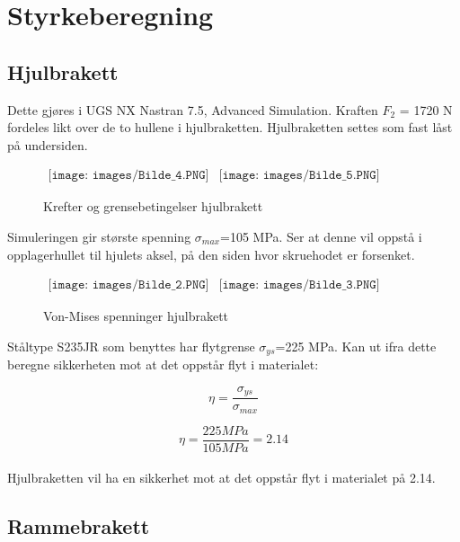 \section{Styrkeberegning}
\subsection{Hjulbrakett}
Dette gjøres i UGS NX Nastran 7.5, Advanced Simulation. Kraften $F_{2}$ = 1720 N fordeles likt over de to hullene i hjulbraketten. Hjulbraketten settes som fast låst på undersiden.

\begin{figure}[H]
\begin{center}$
\begin{array}{ccc}
\texttt{[image: images/Bilde\_4.PNG]} &
\texttt{[image: images/Bilde\_5.PNG]} &  
\end{array}$
\end{center}
\caption{Krefter og grensebetingelser hjulbrakett}
\end{figure}

Simuleringen gir største spenning $\sigma_{max}$=105 MPa. Ser at denne vil oppstå i opplagerhullet til hjulets aksel, på den siden hvor skruehodet er forsenket.

\begin{figure}[H]
\begin{center}$
\begin{array}{ccc}
\texttt{[image: images/Bilde\_2.PNG]} &
\texttt{[image: images/Bilde\_3.PNG]} &  
\end{array}$
\end{center}
\caption{Von-Mises spenninger hjulbrakett}
\end{figure}

Ståltype S235JR som benyttes har flytgrense $\sigma_{ys}$=225 MPa. Kan ut ifra dette beregne sikkerheten mot at det oppstår flyt i materialet:

\begin{equation}
\eta=\frac{\sigma_{ys}}{\sigma_{max}}
\end{equation}

\begin{equation}
\eta=\frac{225 MPa}{105 MPa}=2.14
\end{equation}\\

Hjulbraketten vil ha en sikkerhet mot at det oppstår flyt i materialet på 2.14.

\subsection{Rammebrakett}

